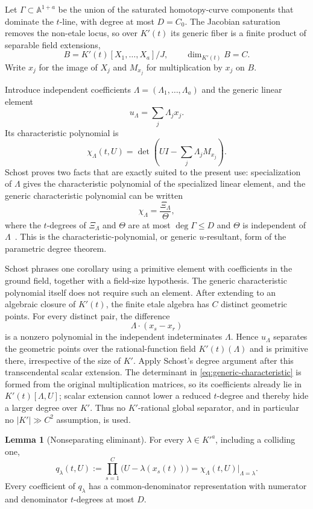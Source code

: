 \documentclass[11pt,a4paper]{article}
\theoremstyle{definition}
\newtheorem{lemma}[theorem]{Lemma}
\theoremstyle{remark}
\begin{document}
Let $\Gamma\subset\mathbb A^{1+a}$ be the union of the saturated homotopy-curve components that dominate the $t$-line, with degree at most $D=C_0$.  The Jacobian saturation removes the non-etale locus, so over $K'(t)$ its generic fiber is a finite product of separable field extensions,
\[
 B=K'(t)[X_1,\ldots,X_a]/J,
 \qquad \dim_{K'(t)}B=C.
\]
Write $x_j$ for the image of $X_j$ and $M_{x_j}$ for multiplication by $x_j$ on $B$.

Introduce independent coefficients $\Lambda=(\Lambda_1,\ldots,\Lambda_a)$ and the generic linear element
\[
 u_\Lambda=\sum_j\Lambda_jx_j.
\]
Its characteristic polynomial is
\begin{equation}\label{eq:generic-characteristic}
 \chi_\Lambda(t,U)
 =\det\!\left(UI-\sum_j\Lambda_jM_{x_j}\right).
\end{equation}
Schost proves two facts that are exactly suited to the present use: specialization of $\Lambda$ gives the characteristic polynomial of the specialized linear element, and the generic characteristic polynomial can be written
\[
 \chi_\Lambda=\frac{\Xi_\Lambda}{\Theta},
\]
where the $t$-degrees of $\Xi_\Lambda$ and $\Theta$ are at most $\deg\Gamma\le D$ and $\Theta$ is independent of $\Lambda$~\cite[Lemmas~2--3 and Proposition~2]{Schost2003}.  This is the characteristic-polynomial, or generic $u$-resultant, form of the parametric degree theorem.

Schost phrases one corollary using a primitive element with coefficients in the ground field, together with a field-size hypothesis.  The generic characteristic polynomial itself does not require such an element.  After extending to an algebraic closure of $K'(t)$, the finite etale algebra has $C$ distinct geometric points.  For every distinct pair, the difference
\[
 \Lambda\cdot(x_s-x_r)
\]
is a nonzero polynomial in the independent indeterminates $\Lambda$.  Hence $u_\Lambda$ separates the geometric points over the rational-function field $K'(t)(\Lambda)$ and is primitive there, irrespective of the size of $K'$.  Apply Schost's degree argument after this transcendental scalar extension.  The determinant in \eqref{eq:generic-characteristic} is formed from the original multiplication matrices, so its coefficients already lie in $K'(t)[\Lambda,U]$; scalar extension cannot lower a reduced $t$-degree and thereby hide a larger degree over $K'$.  Thus no $K'$-rational global separator, and in particular no $|K'|\gg C^2$ assumption, is used.

\begin{lemma}[Nonseparating eliminant]\label{lem:charpoly}
For every $\lambda\in K'^a$, including a colliding one,
\[
 q_\lambda(t,U)
 :=\prod_{s=1}^{C}\bigl(U-\lambda(x_s(t))\bigr)
 =\chi_\Lambda(t,U)\big|_{\Lambda=\lambda}.
\]
Every coefficient of $q_\lambda$ has a common-denominator representation with numerator and denominator $t$-degrees at most $D$.
\end{lemma}
\end{document}
